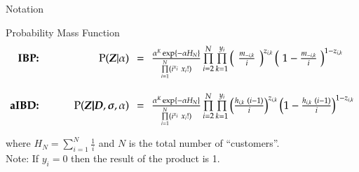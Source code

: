 \documentclass[serif,mathserif,final]{beamer}
\def\prodl#1#2#3{\prod\limits_{#1=#2}^{#3}}
\def\suml#1#2#3{\sum\limits_{#1=#2}^{#3}}
\def\ds{\displaystyle}
\begin{document}
\begin{frame}{}
\begin{columns}[t]
\begin{column}{0.56\linewidth}
\begin{block}{Notation}
\begin{itemize}
        \end{itemize}
      \end{block}





      \begin{block}{Probability Mass Function}
        \[\Large
        \begin{array}{rrcl}
          \text{\textbf{IBP:\hspace{2.5em}}}
          &\text{P}(\bm Z|\alpha) & = & \frac{\alpha^{K}\exp\{-\alpha H_N\}}
                                     {\prodl{i}{1}{N}(i^{x_i}~x_i!)} 
                                \prodl{i}{2}{N}\prodl{k}{1}{y_{i}}
                                \left( \hspace{.39em}  \frac{m_{-i,k}}{i} \hspace{.39em}\right)^{z_{i,k}}
                                \left( \hspace{.30em}1-\frac{m_{-i,k}}{i} \hspace{.30em}\right)^{1-z_{i,k}}\\
          &&&\\
          \text{\textbf{aIBD:\hspace{2.5em}}}
          &\text{P}(\bm{Z|D},\bm\sigma,\alpha) & = & 
                                \frac{\alpha^K \exp\{-\alpha H_N\}} 
                                     {\prodl{i}{1}{N}(i^{x_i}~x_i!)} 
                                \prodl{i}{2}{N}\prodl{k}{1}{y_i} 
                                \left( \frac{h_{i,k}   ~ (i-1)}{i} \right)^{z_{i,k}}
                                \left( 1-\frac{h_{i,k} ~ (i-1)}{i} \right)^{1-z_{i,k}}\\

        \end{array}  
        \]

        where $H_N = \suml{i}{1}{N} \ds\frac{1}{i}$ and $N$ is the total
        number of ``customers''.  \\ Note: If $y_i=0$ then the result of the product is 1.
      \end{block}



\end{column}
\end{columns}
\end{frame}
\end{document}
